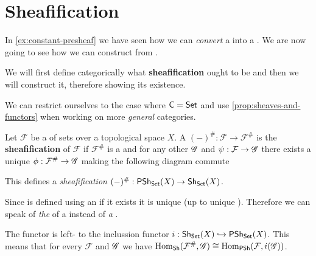 \documentclass[../main.tex]{subfiles}
\begin{document}
\section{Sheafification}
In \autoref{ex:constant-presheaf} we have seen how we can \textit{convert} a  into a .
We are now going to see how we can construct  from .

We will first define categorically what \textbf{sheafification} ought to be and then we will construct it, therefore showing its existence.

We can restrict ourselves to the case where \(\mathsf{C} = \mathsf{Set}\) and use \autoref{prop:sheaves-and-functors} when working on more \textit{general} categories.

\begin{definition}[Sheafification] \label{def:sheafification}
  Let \(\mathcal{F}\) be a  of sets over a topological space \(X\).
  A  \((-)^{\#}: \mathcal{F} \to \mathcal{F}^{\#}\) is the \textbf{sheafification} of \(\mathcal{F}\) if \(\mathcal{F}^{\#}\) is a  and for any other  \(\mathscr{G}\) and  \(\psi: \mathcal{F} \to \mathscr{G}\) there exists a unique  \(\phi: \mathcal{F}^{\#} \to \mathscr{G}\) making the following diagram commute
  \begin{center}
  \end{center}
  This defines a \textit{sheafification } \((-)^{\#}: \mathsf{PSh}_{\mathsf{Set}}(X) \to \mathsf{Sh}_{\mathsf{Set}}(X)\).
\end{definition}

\begin{remark}
  Since  is defined using an  if it exists it is unique (up to unique ).
  Therefore we can speak of \textit{the}  of a  instead of \textit{a} .
\end{remark}

\begin{remark} \label{remark:sheafification-inclussion-adjunction}
  The  functor is left- to the inclussion functor \(i: \mathsf{Sh}_{\mathsf{Set}}(X) \hookrightarrow \mathsf{PSh}_{\mathsf{Set}}(X)\).
  This means that for every  \(\mathcal{F}\) and  \(\mathscr{G}\) we have \(\operatorname{Hom}_{\mathsf{Sh}}(\mathcal{F}^{\#}, \mathscr{G}) \cong \operatorname{Hom}_{\mathsf{PSh}}(\mathcal{F}, i(\mathscr{G}))\).
\end{remark}
\end{document}
